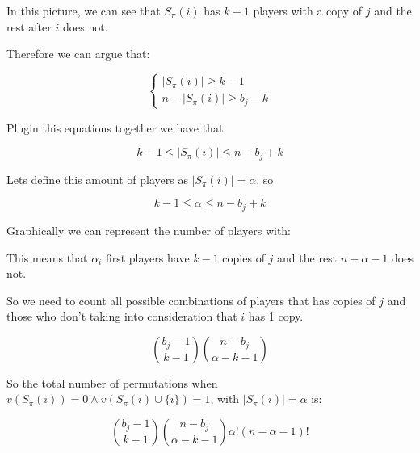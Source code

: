 \documentclass[12pt, a4paper]{article}
\begin{document}
In this picture, we can see that $S_{\pi}(i)$ has $k-1$ players with a copy of $j$ and the rest after $i$ does not.

Therefore we can argue that:

\[
  \begin{cases}
    | S_{\pi}(i) | \geq k-1 \\
    n - | S_{\pi}(i) | \geq b_j - k
  \end{cases}
\]

Plugin this equations together we have that 

\begin{equation}
  k-1 \leq | S_{\pi}(i) | \leq n - b_j + k
\end{equation}

Lets define this amount of players as $| S_{\pi}(i) | = \alpha$, so 

\begin{equation}
  k-1 \leq \alpha \leq n - b_j + k
\end{equation}

Graphically we can represent the number of players with:

\begin{center}
\end{center}

This means that $\alpha_i$ first players have $k-1$ copies of $j$ and the rest $n-\alpha-1$ does not.

So we need to count all possible combinations of players that has copies of $j$ and those who don't taking into consideration that $i$ has 1 copy.

\begin{equation}
  \binom{b_j - 1}{k-1}\binom{n-b_j}{\alpha - k - 1}
\end{equation}

So the total number of permutations when $v(S_{\pi}(i)) = 0 \land v(S_{\pi}(i) \cup \{i\}) = 1$, with $| S_{\pi}(i) | = \alpha$ is:

\begin{equation}
  \binom{b_j - 1}{k-1}\binom{n-b_j}{\alpha - k - 1} \alpha! (n - \alpha - 1)! 
\end{equation}
\end{document}
